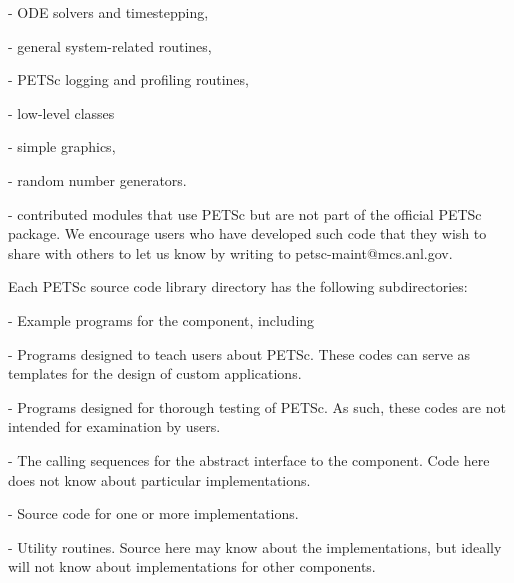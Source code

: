 \begin{tightitemize}
\begin{tightitemize}
 \item {} - ODE solvers and timestepping,
 \item {} - general system-related routines,
 \begin{tightitemize}
   \item {} - PETSc logging and profiling routines,
   \item {} - low-level classes
   \begin{tightitemize}
     \item {} - simple graphics,
     \item {}
     \item {}
     \item {} - random number generators.
   \end{tightitemize}
\end{tightitemize}
 \item {} - contributed modules that use PETSc but are not
    part of the official PETSc package.  We encourage users who have
    developed such code that they wish to share with others to let us
    know by writing to petsc-maint@mcs.anl.gov.
 \end{tightitemize}
\end{tightitemize}

Each PETSc source code library directory has the following subdirectories:
\begin{tightitemize}
\item  {} - Example programs for the component, including
  \begin{tightitemize}
  \item {} - Programs designed to teach users about PETSc.  These
          codes can serve as templates for the design of custom applications.
  \item {} - Programs designed for thorough testing of PETSc.  As such,
          these codes are not intended for examination by users.
  \end{tightitemize}
\item  {} - The calling sequences for the abstract interface
        to the component.
        Code here does not know about particular implementations.
\item  {} - Source code for one or more implementations.
\item  {} - Utility routines.  Source here may know about the
          implementations, but ideally will not know about implementations
          for other components.
\end{tightitemize}

